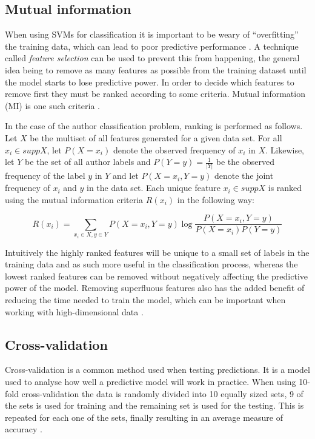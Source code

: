 \documentclass[a4paper,11pt]{kth-mag}
\begin{document}
\subsection{Mutual information}
\label{sec:mi}
When using SVMs for classification it is important to be weary of
``overfitting'' the training data, which can lead to poor predictive
performance \parencite{cristianini2000introduction}. A technique called
\emph{feature selection} can be used to prevent this from happening, the
general idea being to remove as many features as possible from the training
dataset until the model starts to lose predictive power. In order to decide
which features to remove first they must be ranked according to some criteria.
Mutual information (MI) is one such criteria \parencite{guyon2003introduction}.

In the case of the author classification problem, ranking is performed as
follows. Let $X$ be the multiset of all features generated for a given data
set. For all $x_i \in supp X$, let $P(X = x_i)$ denote the observed frequency
of $x_i$ in $X$. Likewise, let $Y$ be the set of all author labels and $P(Y =
y)= \frac{1}{|Y|}$ be the observed frequency of the label $y$ in $Y$ and let
$P(X=x_i,Y=y)$ denote the joint frequency of $x_i$ and $y$ in the data set.
Each unique feature $x_i \in supp X $ is ranked using the mutual information
criteria $R(x_i)$ \parencite{guyon2003introduction} in the following way:

$$R(x_i)= \sum_{x_i \in X, y \in Y} P(X=x_i,Y=y) \log \frac{P(X = x_i,
Y = y)}{P(X = x_i)P(Y = y)}$$

Intuitively the highly ranked features will be unique to a small set of 
labels in the training data and as such more useful in the classification
process, whereas the lowest ranked features can be removed without negatively
affecting the predictive power of the model. Removing superfluous features also
has the added benefit of reducing the time needed to train the model, which can
be important when working with high-dimensional data
\parencite{guyon2003introduction}.

\subsection{Cross-validation}
Cross-validation is a common method used when testing predictions. It is a
model used to analyse how well a predictive model will work in practice. When
using 10-fold cross-validation the data is randomly divided into 10 equally
sized sets, 9 of the sets is used for training and the remaining set is used
for the testing. This is repeated for each one of the sets, finally resulting
in an average measure of accuracy \parencite{hsu2003practical}.        
\end{document}
